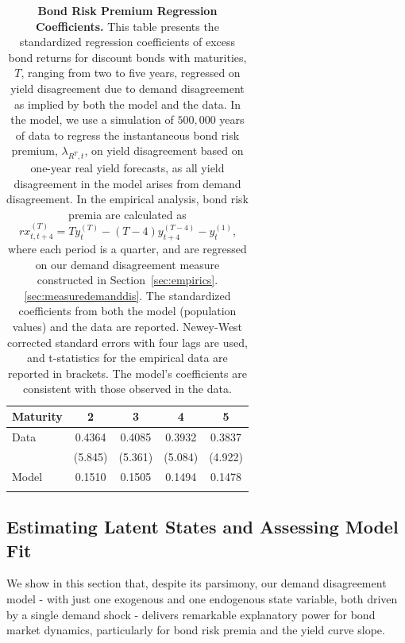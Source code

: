\documentclass[preprint,11pt,authoryear]{elsarticle}
\theoremstyle{plain}
\begin{document}
 

\begin{table}[h!]
\centering
\begin{tabular}{lcccc}
\toprule
\textbf{Maturity} & \textbf{2} & \textbf{3} & \textbf{4} & \textbf{5} \\ 
\midrule
Data   & 0.4364  &  0.4085  & 0.3932  & 0.3837  \\ 
       & (5.845) &  (5.361) & (5.084) & (4.922) \\ 
\midrule
Model  & 0.1510  & 0.1505  & 0.1494  & 0.1478  \\ 
\bottomrule
       &   &    &   &   \\ 
\end{tabular}
\caption{\textbf{Bond Risk Premium Regression Coefficients.} This table presents the standardized regression coefficients of excess bond returns for discount bonds with maturities, $T$,  ranging from two to five years, regressed on yield disagreement due to demand disagreement as implied by both the model and the data. In the model, we use a simulation of $500,000$ years of data to regress the instantaneous bond risk premium, $\lambda_{R^T,t}$, on yield disagreement based on one-year real yield forecasts, as all yield disagreement in the model arises from demand disagreement. In the empirical analysis, bond risk premia are calculated as $rx^{(T)}_{t,t+4} = T y^{(T)}_{t} - (T-4)y^{(T-4)}_{t+4} - y^{(1)}_{t}$, where each period is a quarter, and are regressed on our demand disagreement measure constructed in Section~\ref{sec:empirics}.\ref{sec:measuredemanddis}. The standardized coefficients from both the model (population values) and the data are reported. Newey-West corrected standard errors with four lags are used, and t-statistics for the empirical data are reported in brackets. The model's coefficients are consistent with those observed in the data.}
\label{table:regRP}
\end{table}




\subsection{Estimating Latent States and Assessing Model Fit}\label{sec:backout}



We show in this section that, despite its parsimony, our demand disagreement model - with just one exogenous and one endogenous state variable, both driven by a single demand shock - delivers remarkable explanatory power for bond market dynamics, particularly for bond risk premia and the yield curve slope.
\end{document}

